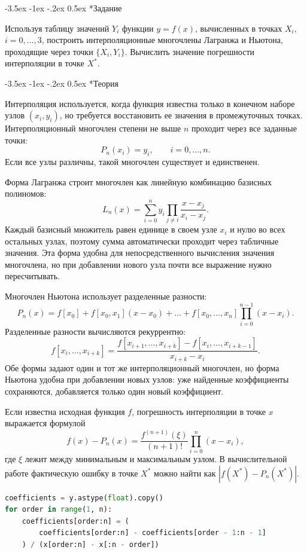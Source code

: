 \documentclass[14pt, a4paper]{article}
\makeatletter
\renewcommand\section{\@startsection {section}{1}{\parindent}%
  {-3.5ex \@plus -1ex \@minus -.2ex}%
  {0.5ex}%
  {\normalfont\Large\bfseries}}
\makeatother
\begin{document}
\section*{Задание}
Используя таблицу значений $Y_i$ функции $y = f(x)$, вычисленных в точках $X_i$, $i = 0, \dots, 3$, построить интерполяционные многочлены Лагранжа и Ньютона, проходящие через точки $\{X_i, Y_i\}$. Вычислить значение погрешности интерполяции в точке $X^*$.

\section*{Теория}
Интерполяция используется, когда функция известна только в конечном наборе узлов $(x_i,y_i)$, но требуется восстановить ее значения в промежуточных точках. Интерполяционный многочлен степени не выше $n$ проходит через все заданные точки:
\[
    P_n(x_i)=y_i,\qquad i=0,\ldots,n.
\]
Если все узлы различны, такой многочлен существует и единственен.

Форма Лагранжа строит многочлен как линейную комбинацию базисных полиномов:
\[
    L_n(x)=\sum_{i=0}^n y_i\prod_{j\ne i}\frac{x-x_j}{x_i-x_j}.
\]
Каждый базисный множитель равен единице в своем узле $x_i$ и нулю во всех остальных узлах, поэтому сумма автоматически проходит через табличные значения. Эта форма удобна для непосредственного вычисления значения многочлена, но при добавлении нового узла почти все выражение нужно пересчитывать.

Многочлен Ньютона использует разделенные разности:
\[
    P_n(x)=f[x_0]+f[x_0,x_1](x-x_0)+\ldots+f[x_0,\ldots,x_n]\prod_{i=0}^{n-1}(x-x_i).
\]
Разделенные разности вычисляются рекуррентно:
\[
    f[x_i,\ldots,x_{i+k}]=
    \frac{f[x_{i+1},\ldots,x_{i+k}]-f[x_i,\ldots,x_{i+k-1}]}{x_{i+k}-x_i}.
\]
Обе формы задают один и тот же интерполяционный многочлен, но форма Ньютона удобна при добавлении новых узлов: уже найденные коэффициенты сохраняются, добавляется только один новый коэффициент.

Если известна исходная функция $f$, погрешность интерполяции в точке $x$ выражается формулой
\[
    f(x)-P_n(x)=\frac{f^{(n+1)}(\xi)}{(n+1)!}\prod_{i=0}^n(x-x_i),
\]
где $\xi$ лежит между минимальным и максимальным узлом. В вычислительной работе фактическую ошибку в точке $X^*$ можно найти как $|f(X^*)-P_n(X^*)|$.

\begin{lstlisting}[language=Python]
coefficients = y.astype(float).copy()
for order in range(1, n):
    coefficients[order:n] = (
        coefficients[order:n] - coefficients[order - 1:n - 1]
    ) / (x[order:n] - x[:n - order])
\end{lstlisting}
\end{document}
